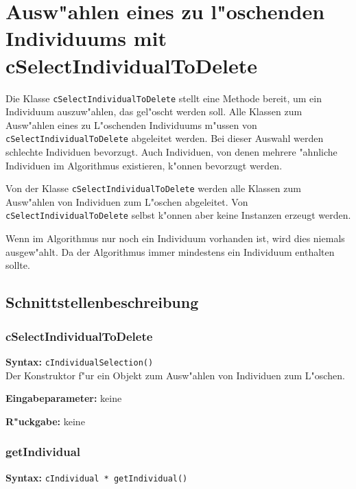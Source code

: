 \section{Ausw"ahlen eines zu l"oschenden Individuums mit cSelectIndividualToDelete}
\label{secIndividualDeletionSelection}\label{secCSelectIndividuumToDelete}

Die Klasse \verb|cSelectIndividualToDelete| stellt eine Methode bereit, um ein Individuum auszuw"ahlen, das gel"oscht werden soll. Alle Klassen zum Ausw"ahlen eines zu L"oschenden Individuums m"ussen von \verb|cSelectIndividualToDelete| abgeleitet werden. Bei dieser Auswahl werden schlechte Individuen bevorzugt. Auch Individuen, von denen mehrere "ahnliche Individuen im Algorithmus existieren, k"onnen bevorzugt werden.

Von der Klasse \verb|cSelectIndividualToDelete| werden alle Klassen zum Ausw"ahlen von Individuen zum L"oschen abgeleitet. Von \verb|cSelectIndividualToDelete| selbst k"onnen aber keine Instanzen erzeugt werden.

Wenn im Algorithmus nur noch ein Individuum vorhanden ist, wird dies niemals ausgew"ahlt. Da der Algorithmus immer mindestens ein Individuum enthalten sollte.


\subsection{Schnittstellenbeschreibung}

\subsubsection{cSelectIndividualToDelete}

\textbf{Syntax:} \verb|cIndividualSelection()| \\

Der Konstruktor f"ur ein Objekt zum Ausw"ahlen von Individuen zum L"oschen.

\bigskip\noindent
\textbf{Eingabeparameter:} keine

\bigskip\noindent
\textbf{R"uckgabe:} keine


\subsubsection{getIndividual}

\textbf{Syntax:} \verb|cIndividual * getIndividual()| \\

